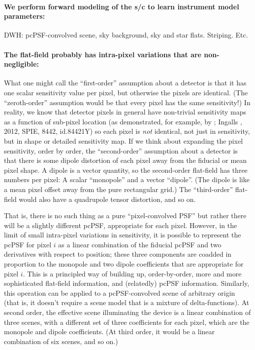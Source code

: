 \documentclass[12pt,preprint]{aastex}
\begin{document}
\paragraph{We perform forward modeling of the s/c to learn instrument model parameters:}



DWH: pcPSF-convolved scene, sky background, sky and star flats.  Striping.  Etc.

\paragraph{The flat-field probably has intra-pixel variations that are non-negligible:}

What one might call the ``first-order'' assumption about a detector is
that it has one scalar sensitivity value per pixel, but otherwise the
pixels are identical.
(The ``zeroth-order'' assumption would be that every pixel has the same
sensitivity!)
In reality, we know that detector pixels in general have non-trivial sensitivity maps as a
function of sub-pixel location (as demonstrated, for example, by \spitzer;
Ingalls \etal, 2012, SPIE, 8442, id.84421Y)
so each pixel is \emph{not} identical,
not just in sensitivity, but in shape or detailed sensitivity map.
If we think about expanding the pixel sensitivity, order by order, the
``second-order'' assumption about a detector is that there is some dipole
distortion of each pixel away from the fiducial or mean pixel shape.
A dipole is a vector quantity, so the second-order flat-field has
three numbers per pixel: A scalar ``monopole'' and a vector
``dipole''.
(The dipole is like a mean pixel offset away from the pure rectangular
grid.)
The ``third-order'' flat-field would also have a quadrupole tensor
distortion, and so on.

That is, there is no such thing as a pure ``pixel-convolved PSF'' but
rather there will be a slightly different pcPSF,
appropriate for each pixel.
However, in the limit of small intra-pixel variations in sensitivity,
it is possible to represent the pcPSF for pixel $i$ as a
linear combination of the fiducial pcPSF and two
derivatives with respect to position; these three components are
coadded in proportion to the monopole and two dipole coefficients
that are appropriate for pixel $i$.
This is a principled way of building up, order-by-order, more and more
sophisticated flat-field information, and (relatedly) pcPSF
information.
Similarly, this operation can be applied to a pcPSF-convolved scene of
arbitrary origin (that is, it doesn't require a scene model that is
a mixture of delta-functions).
At second order, the effective scene illuminating the device is a
linear combination of three scenes, with a different set of three
coefficients for each pixel, which are the monopole and dipole
coefficients.
(At third order, it would be a linear combination of six scenes, and
so on.)
\end{document}
